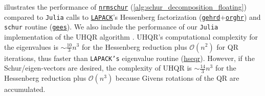 \documentclass[10pt,twoside,dvipsnames]{siamart1116}
\numberwithin{algorithm}{section}
\numberwithin{equation}{section}
\begin{document}
	 illustrates the performance of \href{https://github.com/smataigne/NormalEVP.jl/blob/main/src/normal_schur.jl}{\texttt{nrmschur}} (\cref{alg:schur_decomposition_floating}) compared to \texttt{Julia} calls to \href{https://www.netlib.org/lapack/explore-html/index.html}{\texttt{LAPACK}}'s Hessenberg factorization (\href{https://www.netlib.org/lapack/explore-html/d2/d28/group__gehrd_ga74cea8f05a014cca243674999f71c238.html}{\texttt{gehrd}}+\href{https://www.netlib.org/lapack/explore-html/de/d26/group__unghr_gae1e32db855babbb134fd2a273aceed36.html}{\texttt{orghr}}) and \texttt{schur} routine (\href{https://www.netlib.org/lapack/explore-html/d5/d38/group__gees_gab48df0b5c60d7961190d868087f485bc.html}{\texttt{gees}}). We also include the performance of our \texttt{Julia} implementation of the UHQR algorithm \cite{GRAGG19861}. UHQR's computational complexity for the eigenvalues is $\sim \frac{10}{3}n^3$ for the Hessenberg reduction plus $\mathcal{O}(n^2)$ for QR iterations, thus faster than \texttt{LAPACK's} eigenvalue routine (\href{https://www.netlib.org/lapack/explore-html/d9/dc6/group__hseqr_ga62c3f96d2f67f96d6dc10334e118e451.html#ga62c3f96d2f67f96d6dc10334e118e451}{hseqr}). However, if the Schur/eigen-vectors are desired, the complexity of UHQR is $\sim \frac{14}{3}n^3$ for the Hessenberg reduction plus $\mathcal{O}(n^3)$  because Givens rotations of the QR are accumulated.
	
\end{document}
